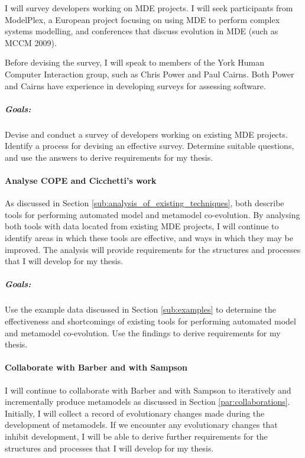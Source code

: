 I will survey developers working on MDE projects. I will seek participants from ModelPlex, a European project focusing on using MDE to perform complex systems modelling, and conferences that discuss evolution in MDE (such as MCCM 2009). 

Before devising the survey, I will speak to members of the York Human Computer Interaction group, such as Chris Power and Paul Cairns. Both Power and Cairns have experience in developing surveys for assessing software.

\subparagraph{Goals:} Devise and conduct a survey of developers working on existing MDE projects. Identify a process for devising an effective survey. Determine suitable questions, and use the answers to derive requirements for my thesis.



\paragraph{Analyse COPE and Cicchetti's work} %
\label{par:analyse_existing_work}
As discussed in Section \ref{sub:analysis_of_existing_techniques}, \cite{herrmannsdoerfer08cope,cicchetti08automating} both describe tools for performing automated model and metamodel co-evolution. By analysing both tools with data located from existing MDE projects, I will continue to identify areas in which these tools are effective, and ways in which they may be improved. The analysis will provide requirements for the structures and processes that I will develop for my thesis.

\subparagraph{Goals:} Use the example data discussed in Section \ref{sub:examples} to determine the effectiveness and shortcomings of existing tools for performing automated model and metamodel co-evolution. Use the findings to derive requirements for my thesis.



\paragraph{Collaborate with Barber and with Sampson} %
\label{par:collaborate_with_barber_and_with_sampson}
I will continue to collaborate with Barber and with Sampson to iteratively and incrementally produce metamodels as discussed in Section \ref{par:collaborations}. Initially, I will collect a record of evolutionary changes made during the development of metamodels. If we encounter any evolutionary changes that inhibit development, I will be able to derive further requirements for the structures and processes that I will develop for my thesis.


